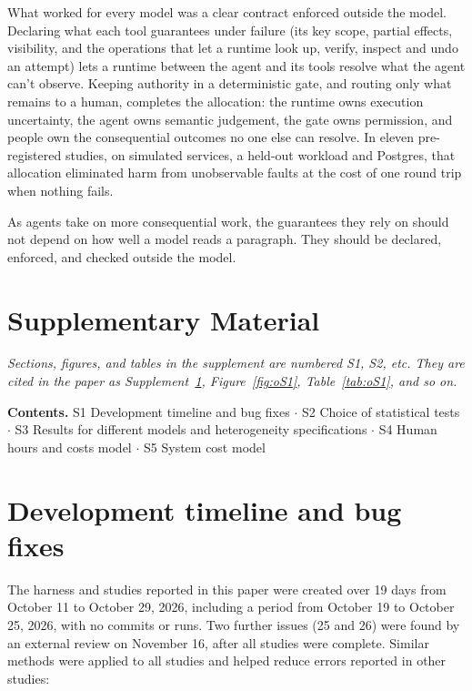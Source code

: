 \documentclass[letterpaper,twocolumn,10pt]{article}
\begin{document}
What worked for every model was a clear contract enforced outside the model. Declaring what each tool guarantees under failure (its key scope, partial effects, visibility, and the operations that let a runtime look up, verify, inspect and undo an attempt) lets a runtime between the agent and its tools resolve what the agent can't observe. Keeping authority in a deterministic gate, and routing only what remains to a human, completes the allocation: the runtime owns execution uncertainty, the agent owns semantic judgement, the gate owns permission, and people own the consequential outcomes no one else can resolve. In eleven pre-registered studies, on simulated services, a held-out workload and Postgres, that allocation eliminated harm from unobservable faults at the cost of one round trip when nothing fails.

As agents take on more consequential work, the guarantees they rely on should not depend on how well a model reads a paragraph. They should be declared, enforced, and checked outside the model.




\clearpage
\onecolumn
\appendix
\renewcommand{\thesection}{S\arabic{section}}
\setcounter{figure}{0}
\setcounter{table}{0}
\section*{Supplementary Material}

\emph{Sections, figures, and tables in the supplement are numbered S1, S2, etc. They are cited in the paper as Supplement~\ref{sec:S1}, Figure~\ref{fig:oS1}, Table~\ref{tab:oS1}, and so on.}

\textbf{Contents.} S1 Development timeline and bug fixes $\cdot$ S2 Choice of statistical tests $\cdot$ S3 Results for different models and heterogeneity specifications $\cdot$ S4 Human hours and costs model $\cdot$ S5 System cost model

\section{Development timeline and bug fixes}\label{sec:S1}

The harness and studies reported in this paper were created over 19 days from October 11 to October 29, 2026, including a period from October 19 to October 25, 2026, with no commits or runs. Two further issues (25 and 26) were found by an external review on November 16, after all studies were complete. Similar methods were applied to all studies and helped reduce errors reported in other studies:
\end{document}
